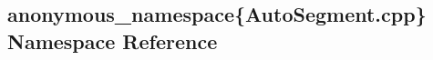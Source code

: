 \hypertarget{namespaceanonymous__namespace_02AutoSegment_8cpp_03}{}\subsection{anonymous\+\_\+namespace\{Auto\+Segment.\+cpp\} Namespace Reference}
\label{namespaceanonymous__namespace_02AutoSegment_8cpp_03}

